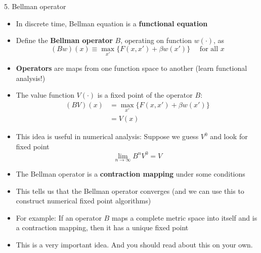 \documentclass[10pt]{beamer}
\begin{document}
\begin{frame}{5. Bellman operator}
\begin{itemize}
\item In discrete time, Bellman equation is a \textbf{functional equation}

\item Define the \textbf{Bellman operator} $B$, operating on function $w(\cdot)$, as
\begin{equation*}
	(Bw)(x) \equiv \max_{x'} \Big\{ F(x, x') + \beta w(x') \Big\} \quad \text{ for all } x
\end{equation*}

\item \textbf{Operators} are maps from one function space to another (learn functional analysis!)

\item The value function $V(\cdot)$ is a fixed point of the operator $B$:
\begin{align*}
	(BV)(x) &= \max_{x'} \Big\{ F(x, x') + \beta w(x') \Big\} \\
	&= V(x)
\end{align*}

\end{itemize}
\end{frame}



\begin{frame}{}
\begin{itemize}

\item This idea is useful in numerical analysis: Suppose we guess $V^0$ and look for fixed point 
\begin{equation*}
	\lim_{n \to \infty} B^n V^0 = V
\end{equation*}

\item The Bellman operator is a \textbf{contraction mapping} under some conditions

\item This tells us that the Bellman operator converges (and we can use this to construct numerical fixed point algorithms)

\item For example: If an operator $B$ maps a complete metric space into itself and is a contraction mapping, then it has a unique fixed point

\item This is a very important idea. And you should read about this on your own. 

\end{itemize}
\end{frame}
\end{document}
